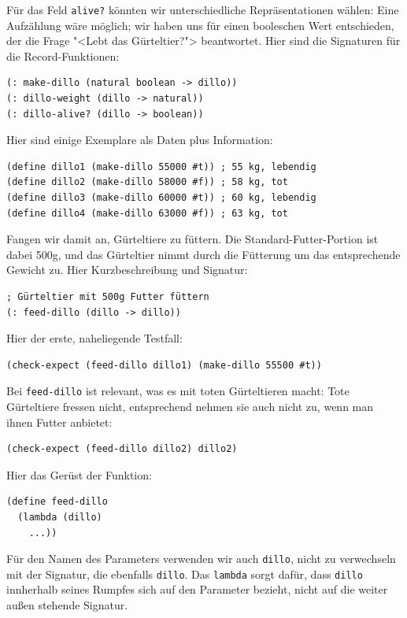 Für das Feld \texttt{alive?} könnten wir unterschiedliche Repräsentationen
wählen: Eine Aufzählung wäre möglich; wir haben uns für einen
booleschen Wert entschieden, der die Frage "<Lebt das Gürteltier?">
beantwortet.  Hier sind die Signaturen für die Record-Funktionen:
%
\begin{verbatim}
(: make-dillo (natural boolean -> dillo))
(: dillo-weight (dillo -> natural))
(: dillo-alive? (dillo -> boolean))
\end{verbatim}
%
Hier sind einige Exemplare als Daten plus Information:
%
\begin{verbatim}
(define dillo1 (make-dillo 55000 #t)) ; 55 kg, lebendig 
(define dillo2 (make-dillo 58000 #f)) ; 58 kg, tot
(define dillo3 (make-dillo 60000 #t)) ; 60 kg, lebendig
(define dillo4 (make-dillo 63000 #f)) ; 63 kg, tot
\end{verbatim}
%
Fangen wir damit an, Gürteltiere zu füttern.  Die
Standard-Futter-Portion ist dabei 500g, und das Gürteltier nimmt durch
die Fütterung um das entsprechende Gewicht zu.  Hier Kurzbeschreibung
und Signatur:
%
\begin{verbatim}
; Gürteltier mit 500g Futter füttern
(: feed-dillo (dillo -> dillo))
\end{verbatim}
%
Hier der erste, naheliegende Testfall:
%
\begin{verbatim}
(check-expect (feed-dillo dillo1) (make-dillo 55500 #t))
\end{verbatim}
%
Bei \texttt{feed-dillo} ist relevant, was es mit toten
Gürteltieren macht: Tote Gürteltiere fressen nicht, entsprechend
nehmen sie auch nicht zu, wenn man ihnen Futter anbietet:
%
\begin{verbatim}
(check-expect (feed-dillo dillo2) dillo2)
\end{verbatim}
%
Hier das Gerüst der Funktion:
\begin{verbatim}
(define feed-dillo
  (lambda (dillo)
    ...))
\end{verbatim}
%
Für den Namen des Parameters verwenden wir auch \texttt{dillo}, nicht
zu verwechseln mit der Signatur, die ebenfalls \texttt{dillo}. Das
\texttt{lambda} sorgt dafür, dass \texttt{dillo} innherhalb seines
Rumpfes sich auf den Parameter bezieht, nicht auf die weiter außen
stehende Signatur.

